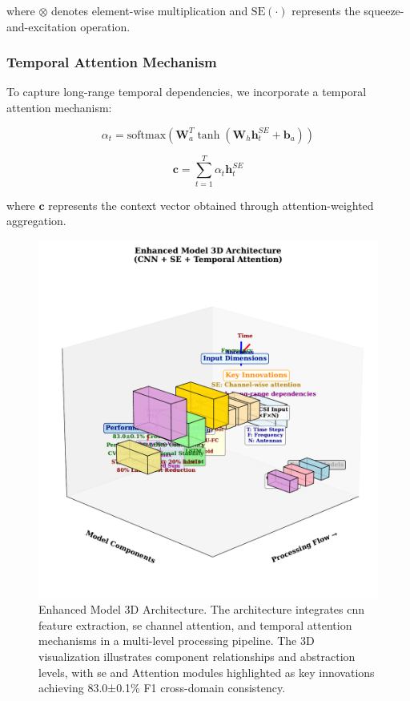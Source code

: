 \documentclass[journal]{IEEEtran}
\begin{document}
where $\otimes$ denotes element-wise multiplication and $\text{SE}(\cdot)$ represents the squeeze-and-excitation operation.

\subsubsection{Temporal Attention Mechanism}

To capture long-range temporal dependencies, we incorporate a temporal attention mechanism:

\begin{equation}
\alpha_t = \text{softmax}(\mathbf{W}_a^T \tanh(\mathbf{W}_h \mathbf{h}_t^{SE} + \mathbf{b}_a))
\end{equation}

\begin{equation}
\mathbf{c} = \sum_{t=1}^{T} \alpha_t \mathbf{h}_t^{SE}
\end{equation}

where $\mathbf{c}$ represents the context vector obtained through attention-weighted aggregation.

\begin{figure}[ht]
\centering
\includegraphics[width=\columnwidth]{figures/figure3_enhanced_3D.pdf}
\caption{Enhanced Model 3D Architecture. The architecture integrates \gls{cnn} feature extraction, \gls{se} channel attention, and temporal attention mechanisms in a multi-level processing pipeline. The 3D visualization illustrates component relationships and abstraction levels, with \gls{se} and Attention modules highlighted as key innovations achieving 83.0±0.1\% F1 cross-domain consistency.}
\label{fig:enhanced_3d_arch}
\end{figure}
\end{document}
